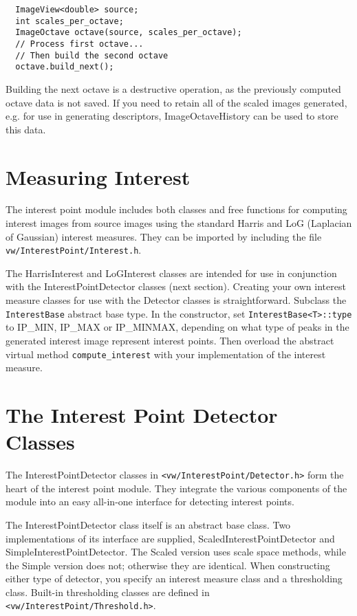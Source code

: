 \begin{verbatim}
  ImageView<double> source;
  int scales_per_octave;
  ImageOctave octave(source, scales_per_octave);
  // Process first octave...
  // Then build the second octave
  octave.build_next();
\end{verbatim}

Building the next octave is a destructive operation, as the previously
computed octave data is not saved. If you need to retain all of the
scaled images generated, e.g. for use in generating descriptors,
ImageOctaveHistory can be used to store this data.

\section{Measuring Interest}
The interest point module includes both classes and free functions
for computing interest images from source images using the
standard Harris \cite{harris88} and LoG (Laplacian of Gaussian)
interest measures. They can be imported by including the file
{\tt vw/InterestPoint/Interest.h}.

The HarrisInterest and LoGInterest classes are intended for use
in conjunction with the InterestPointDetector classes (next
section). Creating your own interest measure classes 
for use with the Detector classes is straightforward.
Subclass the \verb#InterestBase# abstract base type. In the
constructor, set \verb#InterestBase<T>::type# to IP_MIN,
IP_MAX or IP_MINMAX, depending on what type of peaks in the
generated interest image represent interest points. Then
overload the abstract virtual method \verb#compute_interest#
with your implementation of the interest measure.

\section{The Interest Point Detector Classes}
The InterestPointDetector classes in
{\tt <vw/InterestPoint/Detector.h>} form the heart of the interest
point module. They integrate the various components of the module
into an easy all-in-one interface for detecting interest points.

The InterestPointDetector class itself is an abstract base class.
Two implementations of its interface are supplied,
ScaledInterestPointDetector and SimpleInterestPointDetector.
The Scaled version uses scale space methods, while the Simple version
does not; otherwise they are identical. When constructing either
type of detector, you specify an interest measure class and a
thresholding class. Built-in thresholding classes are defined in
{\tt <vw/InterestPoint/Threshold.h>}.

